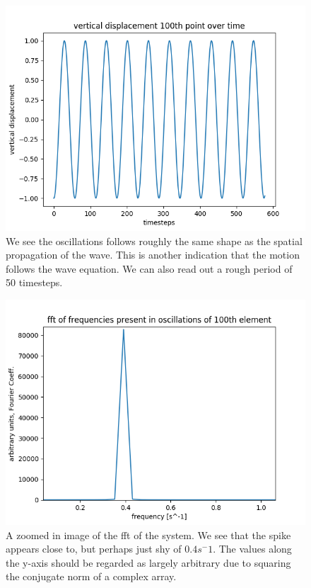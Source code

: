 \documentclass[12pt]{article}
\begin{document}
\begin{figure}
	\includegraphics[scale=0.7]{y99_OverTime}
	\caption{We see the oscillations follows roughly the same shape as the spatial propagation of the wave. This is another indication that the motion follows the wave equation. We can also read out a rough period of 50 timesteps. }
\end{figure}

\begin{figure}
	\includegraphics[scale=0.7]{fft_y99_OverTime}
	\caption{A zoomed in image of the fft of the system. We see that the spike appears close to, but perhaps just shy of $0.4s^-1$. The values along the y-axis should be regarded as largely arbitrary due to squaring the conjugate norm of a complex array.}
\end{figure}
\end{document}
